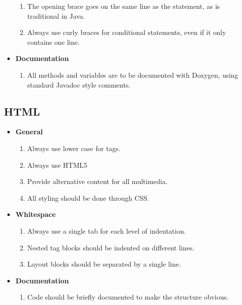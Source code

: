 \documentclass[11pt,a4paper]{article}
\begin{document}
\begin{itemize}
	\begin{enumerate}
	\item The opening brace goes on the same line as the statement, as is traditional in Java.
	\item Always use curly braces for conditional statements, even if it only contains one line.
	\end{enumerate}
\item \textbf{Documentation}
	\begin{enumerate}
	\item All methods and variables are to be documented with Doxygen, using standard Javadoc style comments.
	\end{enumerate}
\end{itemize}

\subsection{HTML}
\begin{itemize}
\item \textbf{General}
	\begin{enumerate}
	\item Always use lower case for tags.
    \item Always use HTML5
    \item Provide alternative content for all multimedia.
    \item All styling should be done through CSS.
	\end{enumerate}
\item \textbf{Whitespace}
	\begin{enumerate}
    \item Always use a single tab for each level of indentation.
    \item Nested tag blocks should be indented on different lines.
    \item Layout blocks should be separated by a single line.
	\end{enumerate}
\item \textbf{Documentation}
	\begin{enumerate}
	\item Code should be briefly documented to make the structure obvious.
	\end{enumerate}
\end{itemize}
\end{document}
